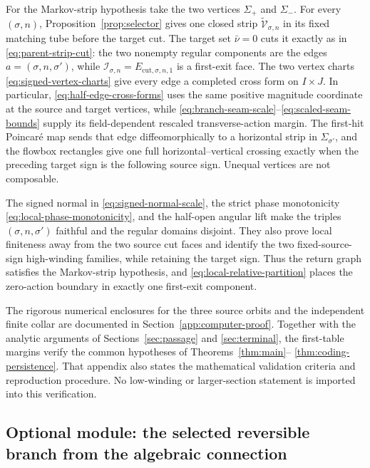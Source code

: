 \documentclass[11pt]{amsart}
\numberwithin{equation}{section}
\theoremstyle{definition}
\theoremstyle{remark}
\begin{document}
For the Markov-strip hypothesis take the two vertices $\Sigma_+$ and
$\Sigma_-$.  For every $(\sigma,n)$,
Proposition~\ref{prop:selector} gives one closed strip
$\widetilde{\mathcal V}_{\sigma,n}$ in its fixed matching tube before the target cut.  The target
set $\bar\nu=0$ cuts it exactly as in
\eqref{eq:parent-strip-cut}: the two nonempty regular components are the
edges $a=(\sigma,n,\sigma')$, while
$\mathcal I_{\sigma,n}=E_{\mathrm{cut},\sigma,n,1}$ is a first-exit face.  The two
vertex charts \eqref{eq:signed-vertex-charts} give every edge a completed
cross form on $I\times J$.  In particular,
\eqref{eq:half-edge-cross-forms} uses the same positive magnitude coordinate
at the source and target vertices, while
\eqref{eq:branch-seam-scale}--\eqref{eq:scaled-seam-bounds} supply its
field-dependent rescaled transverse-action margin.
The first-hit Poincar\'e map sends that edge diffeomorphically to a
horizontal strip in $\Sigma_{\sigma'}$, and the flowbox rectangles give one full
horizontal--vertical crossing exactly when the preceding target sign is
the following source sign.  Unequal vertices are not composable.

The signed normal in \eqref{eq:signed-normal-scale}, the strict phase
monotonicity \eqref{eq:local-phase-monotonicity}, and the half-open angular
lift make the triples $(\sigma,n,\sigma')$ faithful and the regular domains
disjoint.  They also prove local finiteness away from the two source cut
faces and identify the two fixed-source-sign high-winding families, while
retaining the target sign.  Thus the return graph satisfies the
Markov-strip hypothesis, and \eqref{eq:local-relative-partition} places
the zero-action boundary in exactly one first-exit component.

The rigorous numerical enclosures for the three source orbits and the
independent finite collar are documented in
Section~\ref{app:computer-proof}.  Together with the analytic arguments of
Sections~\ref{sec:passage} and \ref{sec:terminal}, the first-table margins
verify the common hypotheses of Theorems~\ref{thm:main}--
\ref{thm:coding-persistence}.  That appendix also states
the mathematical validation criteria and reproduction procedure.
No low-winding or larger-section statement is imported into this
verification.

\subsection{Optional module: the selected reversible branch from the algebraic connection}
\label{sec:optional-selected-branch}
\end{document}
